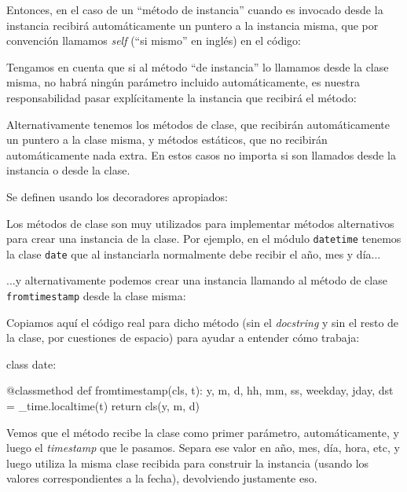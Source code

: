 Entonces, en el caso de un ``método de instancia'' cuando es invocado desde la instancia recibirá automáticamente un puntero a la instancia misma, que por convención llamamos \textit{self} (``si mismo'' en inglés) en el código:


Tengamos en cuenta que si al método ``de instancia'' lo llamamos desde la clase misma, no habrá ningún parámetro incluido automáticamente, es nuestra responsabilidad pasar explícitamente la instancia que recibirá el método:


Alternativamente tenemos los métodos de clase, que recibirán automáticamente un puntero a la clase misma, y métodos estáticos, que no recibirán automáticamente nada extra. En estos casos no importa si son llamados desde la instancia o desde la clase.

Se definen usando los decoradores apropiados:


Los métodos de clase son muy utilizados para implementar métodos alternativos para crear una instancia de la clase. Por ejemplo, en el módulo \texttt{datetime} tenemos la clase \texttt{date} que al instanciarla normalmente debe recibir el año, mes y día...


...y alternativamente podemos crear una instancia llamando al método de clase \texttt{fromtimestamp} desde la clase misma:


Copiamos aquí el código real para dicho método (sin el \textit{docstring} y sin el resto de la clase, por cuestiones de espacio) para ayudar a entender cómo trabaja:

\begin{py}
class date:
    
    @classmethod
    def fromtimestamp(cls, t):
        y, m, d, hh, mm, ss, weekday, jday, dst = _time.localtime(t)
        return cls(y, m, d)
\end{py}

Vemos que el método recibe la clase como primer parámetro, automáticamente, y luego el \textit{timestamp} que le pasamos. Separa ese valor en año, mes, día, hora, etc, y luego utiliza la misma clase recibida para construir la instancia (usando los valores correspondientes a la fecha), devolviendo justamente eso.

